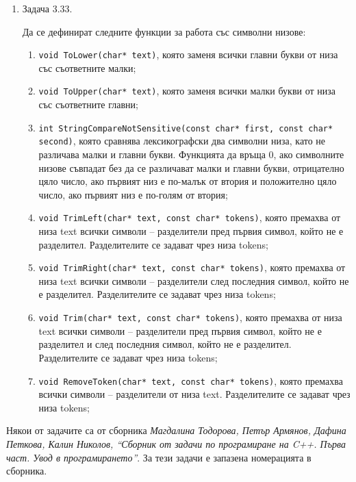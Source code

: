 \documentclass[12pt,a4paper]{article}
\begin{document}
\begin{enumerate}
	 	\item Задача 3.33.


	 Да се дефинират следните функции за работа със символни низове:


	 \begin{enumerate}

		\item \texttt{void ToLower(char* text)}, която заменя всички главни букви от низа със съответните малки;

		\item \texttt{void ToUpper(char* text)}, която заменя всички малки букви от низа със съответните главни;

	 	\item \texttt{int StringCompareNotSensitive(const char* first, const char* second)}, която сравнява лексикографски два символни низа, като не различава малки и главни букви. Функцията да връща 0, ако символните низове съвпадат без да се различават малки и главни букви, отрицателно цяло число, ако първият низ е по-малък от втория и положително цяло число, ако първият низ е по-голям от втория;

	 	\item \texttt{void TrimLeft(char* text, const char* tokens)}, която премахва от низа text всички символи – разделители пред първия символ, който не е разделител. Разделителите се задават чрез низа tokens;

	 	\item \texttt{void TrimRight(char* text, const char* tokens)}, която премахва от низа text всички символи – разделители след последния символ, който не е разделител. Разделителите се задават чрез низа tokens;

	 	\item \texttt{void Trim(char* text, const char* tokens)}, която премахва от низа text всички символи – разделители пред първия символ, който не е разделител и след последния символ, който не е разделител. Разделителите се задават чрез низа tokens;

	 	\item \texttt{void RemoveToken(char* text, const char* tokens)}, която премахва всички символи – разделители от низа text. Разделителите се задават чрез низа tokens;

	 


	 \end{enumerate}

		
\end{enumerate}


	\vspace{20px}

	\small{Някои от задачите са от сборника \textit{Магдалина Тодорова, Петър Армянов, Дафина Петкова, Калин Николов, ``Сборник от задачи по програмиране на C++. Първа част. Увод в програмирането''}. За тези задачи е запазена номерацията в сборника.}
\end{document}
